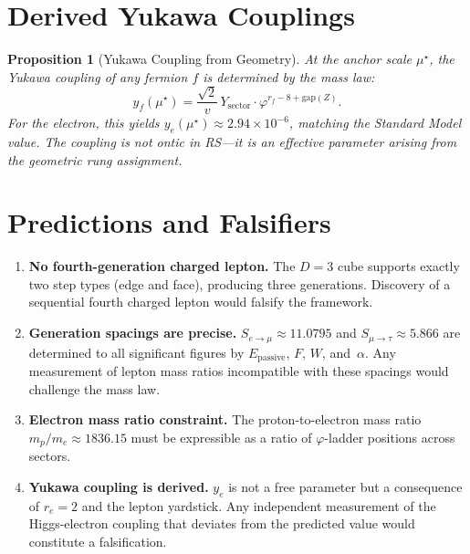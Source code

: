 \documentclass[12pt,a4paper]{article}
\newtheorem{proposition}[theorem]{Proposition}
\theoremstyle{definition}
\theoremstyle{remark}
\begin{document}
\section{Derived Yukawa Couplings}
\label{sec:yukawa}

\begin{proposition}[Yukawa Coupling from Geometry]
\label{prop:yukawa}
At the anchor scale $\mu^\star$, the Yukawa coupling of any
fermion $f$ is determined by the mass law:
\begin{equation}
  y_f(\mu^\star) = \frac{\sqrt{2}}{v}\,
  Y_{\mathrm{sector}} \cdot \varphi^{r_f - 8 + \mathrm{gap}(Z)}.
\end{equation}
For the electron, this yields
$y_e(\mu^\star) \approx 2.94 \times 10^{-6}$, matching the
Standard Model value.  The coupling is not ontic in RS---it is
an effective parameter arising from the geometric rung
assignment.
\end{proposition}

\section{Predictions and Falsifiers}
\label{sec:predictions}

\begin{enumerate}
  \item \textbf{No fourth-generation charged lepton.}
  The $D = 3$ cube supports exactly two step types
  (edge and face), producing three generations.  Discovery of a
  sequential fourth charged lepton would falsify the framework.

  \item \textbf{Generation spacings are precise.}
  $S_{e \to \mu} \approx 11.0795$ and
  $S_{\mu \to \tau} \approx 5.866$ are determined to all
  significant figures by $E_{\mathrm{passive}}$, $F$, $W$,
  and~$\alpha$.  Any measurement of lepton mass ratios
  incompatible with these spacings would challenge the mass law.

  \item \textbf{Electron mass ratio constraint.}
  The proton-to-electron mass ratio
  $m_p/m_e \approx 1836.15$ must be expressible as a ratio
  of $\varphi$-ladder positions across sectors.

  \item \textbf{Yukawa coupling is derived.}
  $y_e$ is not a free parameter but a consequence of
  $r_e = 2$ and the lepton yardstick.  Any independent
  measurement of the Higgs-electron coupling that
  deviates from the predicted value would constitute
  a falsification.
\end{enumerate}
\end{document}
